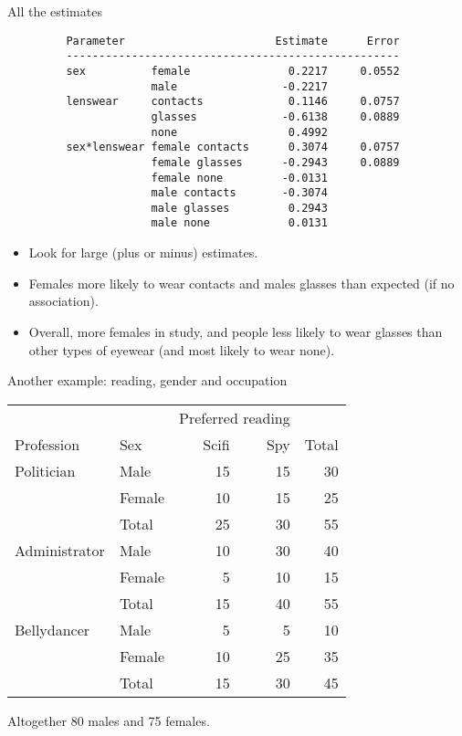 \documentclass[pdf]{prosper}
\begin{document}
\begin{slide}{All the estimates}

{\scriptsize
\begin{verbatim}
         Parameter                       Estimate      Error
         ---------------------------------------------------
         sex          female               0.2217     0.0552
                      male                -0.2217
         lenswear     contacts             0.1146     0.0757
                      glasses             -0.6138     0.0889
                      none                 0.4992
         sex*lenswear female contacts      0.3074     0.0757
                      female glasses      -0.2943     0.0889
                      female none         -0.0131
                      male contacts       -0.3074
                      male glasses         0.2943
                      male none            0.0131

\end{verbatim}
}

\begin{itemize}
\item Look for large (plus or minus) estimates.
\item Females more likely to wear contacts and males glasses than expected (if no association).
\item Overall, more females in study, and people less likely to wear glasses than other types of eyewear (and most likely to wear none).
\end{itemize}
  
\end{slide}

\begin{slide}{Another example: reading, gender and occupation}

  \begin{tabular}{|l|l|rr|r|}
    \hline
    && \multicolumn{2}{|c|}{Preferred reading} &\\
    Profession & Sex & Scifi & Spy & Total \\
    \hline
    Politician & Male & 15 & 15 & 30\\
    & Female & 10 & 15 & 25\\
    \hline
    & Total & 25 & 30 & 55\\
    \hline \hline
    Administrator & Male & 10 & 30 & 40\\
    & Female & 5 & 10 & 15\\
    \hline
    & Total & 15 & 40 & 55\\
    \hline \hline
    Bellydancer & Male & 5 & 5 & 10\\
    & Female & 10 & 25 & 35 \\
    \hline
    & Total & 15 & 30 & 45\\
    \hline
    \hline
  \end{tabular}

  Altogether 80 males and 75 females.
  
\end{slide}
\end{document}
